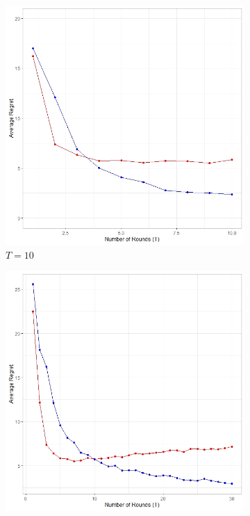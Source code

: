 \documentclass[11pt]{article}
\begin{document}
\begin{figure}[ht]
    \begin{subfigure}{0.33\textwidth}
        \centering
        \includegraphics[width = \textwidth]{figT10.jpeg}
        \caption{$T = 10$}
    \end{subfigure}
    \begin{subfigure}{0.33\textwidth}
        \centering
        \includegraphics[width = \textwidth]{figT30.jpeg}

\end{subfigure}
\end{figure}
\end{document}
